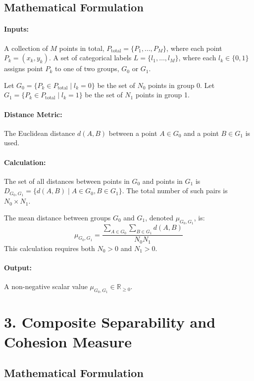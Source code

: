 \documentclass{article}
\begin{document}
\subsection*{Mathematical Formulation}

\paragraph{Inputs:}
A collection of $M$ points in total, $P_{\text{total}} = \{P_1, \dots, P_M\}$, where each point $P_k = (x_k, y_k)$.
A set of categorical labels $L = \{l_1, \dots, l_M\}$, where each $l_k \in \{0, 1\}$ assigns point $P_k$ to one of two groups, $G_0$ or $G_1$.

Let $G_0 = \{P_k \in P_{\text{total}} \mid l_k = 0\}$ be the set of $N_0$ points in group 0.
Let $G_1 = \{P_k \in P_{\text{total}} \mid l_k = 1\}$ be the set of $N_1$ points in group 1.

\paragraph{Distance Metric:}
The Euclidean distance $d(A, B)$ between a point $A \in G_0$ and a point $B \in G_1$ is used.

\paragraph{Calculation:}
The set of all distances between points in $G_0$ and points in $G_1$ is $D_{G_0,G_1} = \{d(A, B) \mid A \in G_0, B \in G_1\}$.
The total number of such pairs is $N_0 \times N_1$.

The mean distance between groups $G_0$ and $G_1$, denoted $\mu_{G_0,G_1}$, is:
$$ \mu_{G_0,G_1} = \frac{\sum_{A \in G_0} \sum_{B \in G_1} d(A, B)}{N_0 N_1} $$
This calculation requires both $N_0 > 0$ and $N_1 > 0$.

\paragraph{Output:}
A non-negative scalar value $\mu_{G_0,G_1} \in \mathbb{R}_{\ge 0}$.

\section*{3. Composite Separability and Cohesion Measure}

\subsection*{Mathematical Formulation}
\end{document}
